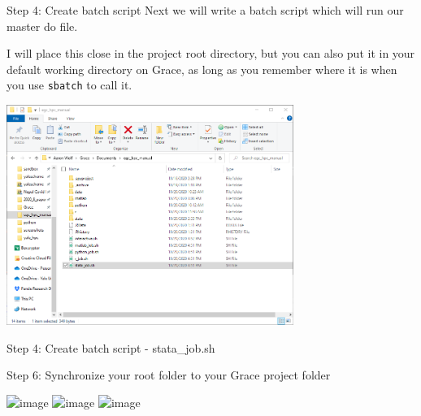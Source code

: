 \documentclass[10pt,xcolor={svgnames}]{beamer}
\begin{document}
\begin{frame}{Step 4: Create batch script} 
\center
Next we will write a batch script which will run our master do file.

I will place this close in the project root directory, but you can also put it in your default working directory on Grace, as long as you remember where it is when you use \texttt{sbatch} to call it.

\includegraphics[width=0.7\textwidth]{screenshots/fig10a.PNG} 

\end{frame}


\begin{frame}[fragile]{Step 4: Create batch script - stata\_job.sh}
\center

\end{frame}

\begin{frame}{Step 6: Synchronize your root folder to your Grace project folder}
\center
{}


\includegraphics<1>[width=0.9\textwidth]{screenshots/fig11a.PNG}
\includegraphics<2>[width=0.6\textwidth]{screenshots/fig11b.PNG}
\includegraphics<3>[width=0.7\textwidth]{screenshots/fig11c.PNG}

\end{frame}
\end{document}
